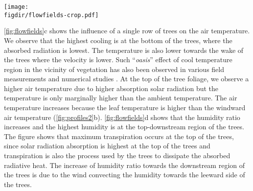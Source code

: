 
	\begin{sidewaysfigure}[p]
	\centering
	\texttt{[image: \\figdir/flowfields-crop.pdf]}
	\caption{Flow field past a single row of trees for the reference case with domain described in \cref{fig:domain}, with $r_s=r_{\textit{s,min}}$ and environmental and tree properties tabulated in \cref{tab:environmentalcond,tab:plantcond}, respectively.  Normalized velocity $\tavg{\mvec{u}}/U_{\textit{ref}}$,  turbulence intensity $\textit{I}=(2/3\,k)/\tavg{\mvec{u}}$  air temperature $T$ ($^{\circ}$C) and  humidity ratio $w$ (g\,kg$^{-1}$).}
	\label{fig:flowfields}
	\end{sidewaysfigure}

\cref{fig:flowfields}c shows the influence of a single row of trees on the air temperature. We observe that the highest cooling is at the bottom of the trees, where the absorbed radiation is lowest. The temperature is also lower towards the wake of the trees where the velocity is lower. Such ``\textit{oasis}'' effect of cool temperature region in the vicinity of vegetation has also been observed in various field measurements \citep{Kurn1994, Taha1997, Wong2003} and numerical studies \citep{Dimoudi2003,Gromke2011}. At the top of the tree foliage, we observe a higher air temperature due to higher absorption solar radiation but the temperature is only marginally higher than the ambient temperature. The air temperature increases because the leaf temperature is higher than the windward air temperature (\cref{fig:profiles2}b). \cref{fig:flowfields}d shows that the humidity ratio increases and the highest humidity is at the top-downstream region of the trees. The figure shows that maximum transpiration occurs at the top of the trees, since solar radiation absorption is highest at the top of the trees and transpiration is also the process used by the trees to dissipate the absorbed radiative heat. The increase of humidity ratio towards the downstream region of the trees is due to the wind convecting the humidity towards the leeward side of the trees.

